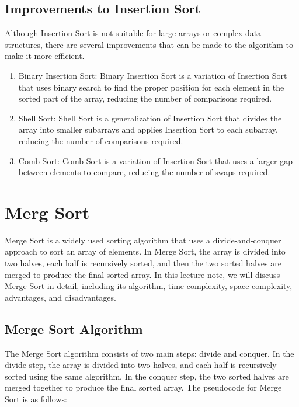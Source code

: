 \documentclass[a4paper, 11pt, oneside]{book} %
\begin{document}
\subsection{Improvements to Insertion Sort}

Although Insertion Sort is not suitable for large arrays or complex data structures, there are several improvements that can be made to the algorithm to make it more efficient.

\begin{enumerate}
  \item Binary Insertion Sort: Binary Insertion Sort is a variation of Insertion Sort that uses binary search to find the proper position for each element in the sorted part of the array, reducing the number of comparisons required.
  \item Shell Sort: Shell Sort is a generalization of Insertion Sort that divides the array into smaller subarrays and applies Insertion Sort to each subarray, reducing the number of comparisons required.
  \item Comb Sort: Comb Sort is a variation of Insertion Sort that uses a larger gap between elements to compare, reducing the number of swaps required.
\end{enumerate}

\section{Merg Sort} 
Merge Sort is a widely used sorting algorithm that uses a divide-and-conquer approach to sort an array of elements. In Merge Sort, the array is divided into two halves, each half is recursively sorted, and then the two sorted halves are merged to produce the final sorted array.
\vspace{0.75\baselineskip} %
In this lecture note, we will discuss Merge Sort in detail, including its algorithm, time complexity, space complexity, advantages, and disadvantages.

\subsection{Merge Sort Algorithm}
The Merge Sort algorithm consists of two main steps: divide and conquer. In the divide step, the array is divided into two halves, and each half is recursively sorted using the same algorithm. In the conquer step, the two sorted halves are merged together to produce the final sorted array.
\vspace{0.75\baselineskip} %
The pseudocode for Merge Sort is as follows:
\end{document}
